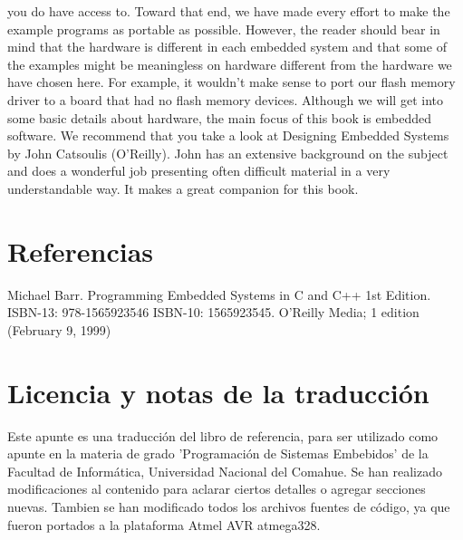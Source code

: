\documentclass[output=paper, 
colorlinks,
citecolor=brown,
newtxmath
]{langscibook}
\begin{document}
you do have access to. Toward that end, we have made every effort to make the example programs as
portable as possible. However, the reader should bear in mind that the hardware is different in each
embedded system and that some of the examples might be meaningless on hardware different from the
hardware we have chosen here. For example, it wouldn't make sense to port our flash memory driver to a
board that had no flash memory devices.
Although we will get into some basic details about hardware, the main focus of this book is embedded
software. We recommend that you take a look at Designing Embedded Systems by John Catsoulis
(O'Reilly). John has an extensive background on the subject and does a wonderful job presenting often
difficult material in a very understandable way. It makes a great companion for this book.





\section{Referencias}

Michael Barr. Programming Embedded Systems in C and C++ 1st Edition. ISBN-13: 978-1565923546
ISBN-10: 1565923545. O'Reilly Media; 1 edition (February 9, 1999)


\section*{Licencia y notas de la traducción}

Este apunte es una traducción del libro de referencia, para
ser utilizado como apunte en la materia de grado
'Programación de Sistemas Embebidos' de la Facultad de Informática,
Universidad Nacional del Comahue.
Se han realizado modificaciones
al contenido para aclarar ciertos detalles o agregar secciones nuevas.
 Tambien se han
modificado todos los archivos fuentes de código, ya que fueron
portados a la plataforma Atmel AVR atmega328.
\end{document}
